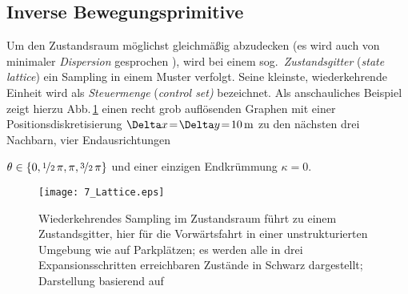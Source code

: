 \subsection{Inverse Bewegungsprimitive}
Um den Zustandsraum möglichst gleichmäßig abzudecken (es wird auch von minimaler \emph{Dispersion} gesprochen \cite{lavalle2006pa}), wird bei einem sog.\ \emph{Zustandsgitter} (\emph{state lattice}) \cite{pivtoraiko2007optimal} ein Sampling in einem Muster verfolgt. Seine kleinste, wiederkehrende Einheit wird als \emph{Steuermenge} (\emph{control set)} bezeichnet. 
Als anschauliches Beispiel zeigt hierzu Abb.\,\ref{fig:lattice} einen recht grob auflösenden Graphen mit einer Positionsdiskretisierung $\Delta x\!=\!\Delta y \!=\! \unit[10]{m}$ zu den nächsten drei Nachbarn, vier Endausrichtungen{ $\theta \in \{0, \nicefrac{1}{2}\,\pi, \pi, \nicefrac{3}{2}\,\pi \}$ und einer einzigen Endkrümmung  $\kappa = 0$. \\
%
\begin{figure}[h]
\centering
  	\texttt{[image: 7\_Lattice.eps]}
	\caption[Wiederkehrendes Sampling im Zustandsraum]{Wiederkehrendes Sampling im Zustandsraum führt zu einem Zustandsgitter, hier für die Vorwärtsfahrt in einer unstrukturierten Umgebung wie auf Parkplätzen; es werden alle in drei Expansionsschritten erreichbaren Zustände in Schwarz dargestellt; Darstellung basierend auf \cite{mcnaughton}}
	\label{fig:lattice}
\end{figure}

}
